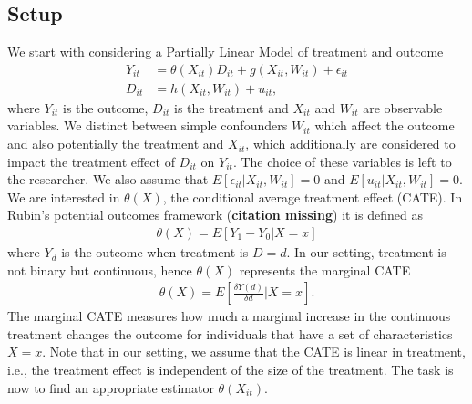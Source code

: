 \subsection{Setup} \label{sec:dml-idea}
We start with considering a Partially Linear Model of treatment and outcome 
\begin{align}
    Y_{it}&=\theta(X_{it})D_{it}+g(X_{it}, W_{it})+\epsilon_{it} \label{eq:plm1}\\
    D_{it}&=h(X_{it}, W_{it})+u_{it}, \label{eq:plm2}
\end{align}
where $Y_{it}$ is the outcome, $D_{it}$ is the treatment and $X_{it}$ and $W_{it}$ are observable variables. We distinct between simple confounders $W_{it}$ which affect the outcome and also potentially the treatment and $X_{it}$, which additionally are considered to impact the treatment effect of $D_{it}$ on $Y_{it}$. The choice of these variables is left to the researcher. We also assume that $E[\epsilon_{it}|X_{it}, W_{it}]=0$ and $E[u_{it}|X_{it}, W_{it}]=0$. \\ 
We are interested in $\theta(X)$, the conditional average treatment effect (CATE). In Rubin's potential outcomes framework (\textbf{citation missing}) it is defined as 
\begin{align*}
    \theta(X)=E[Y_1 - Y_0 | X=x]
\end{align*}
where $Y_d$ is the outcome when treatment is $D=d$. In our setting, treatment is not binary but continuous, hence $\theta(X)$ represents the marginal CATE
\begin{align*}
    \theta(X)=E\left[\frac{\delta Y(d)}{\delta d} \bigg| X=x\right].
\end{align*}
The marginal CATE measures how much a marginal increase in the continuous treatment changes the outcome for individuals that have a set of characteristics $X=x$. Note that in our setting, we assume that the CATE is linear in treatment, i.e., the treatment effect is independent of the size of the treatment. The task is now to find an appropriate estimator ${\theta}(X_{it})$.

